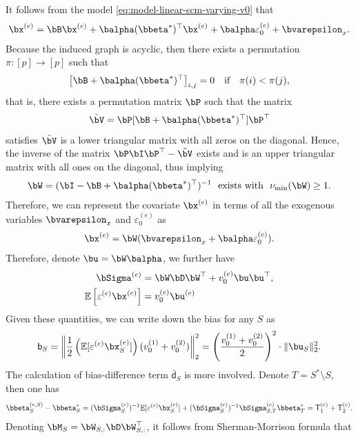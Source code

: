 \documentclass[10pt]{article}
\numberwithin{equation}{section}
\begin{document}
It follows from the model \eqref{eq:model-linear-scm-varying-v0} that
\begin{align*}
\bx^{(e)} = \bB \bx^{(e)} + 	\balpha (\bbeta^*)^\top \bx^{(e)} + \balpha \varepsilon^{(e)}_0 + \bvarepsilon_x.
\end{align*} Because the induced graph is acyclic, then there exists a permutation $\pi: [p] \to [p]$ such that
\begin{align*}
	\left[\bB + \balpha (\bbeta^*)^\top \right]_{i,j} = 0 ~~~ \text{if} ~~~ \pi(i) < \pi(j),
\end{align*} that is, there exists a permutation matrix $\bP$ such that the matrix 
\begin{align*}
	\tilde{\bV} = \bP [\bB + \balpha (\bbeta^*)^\top] \bP^\top
\end{align*} satisfies $\tilde{\bV}$ is a lower triangular matrix with all zeros on the diagonal. Hence, the inverse of the matrix $\bP \bI \bP^\top - \tilde{\bV}$ exists and is an upper triangular matrix with all ones on the diagonal, thus implying
\begin{align*}
	\bW = (\bI - \bB + \balpha (\bbeta^*)^\top)^{-1} ~~\text{exists with}~~ \nu_{\min}(\bW) \ge 1.
\end{align*} Therefore, we can represent the covariate $\bx^{(e)}$ in terms of all the exogenous variables $\bvarepsilon_x$ and $\varepsilon_0^{(e)}$ as
\begin{align}
\label{eq:proof-ex2-eq-x}
	\bx^{(e)} = \bW (\bvarepsilon_x + \balpha \varepsilon_0^{(e)}).
\end{align} Therefore, denote $\bu = \bW \balpha$, we further have
\begin{align}
\bSigma^{(e)} &= \bW \bD \bW^\top + v_0^{(e)} \bu \bu^\top,\\
\mathbb{E}\left[\varepsilon^{(e)} \bx^{(e)}\right] &= v_0^{(e)} \bu^{(e)}
\end{align}
Given these quantities, we can write down the bias for any $S$ as
\begin{align}
\label{eq:proof-ex2-b}
	\mathsf{b}_S = \left\|\frac{1}{2} \left(\mathbb{E}[\varepsilon^{(e)} \bx_S^{(e)}]\right) (v_0^{(1)} + v_0^{(2)}) \right\|_2^2 = \Bigg(\frac{v_0^{(1)} + v_0^{(2)}}{2}\Bigg)^2 \cdot \|\bu_S\|_2^2.
\end{align}
The calculation of bias-difference term $\bar{\mathsf{d}}_S$ is more involved. Denote $T=S^*\setminus S$, then one has
\begin{align*}
	\bbeta^{(e,S)}_S - \bbeta^*_S = (\bSigma_S^{(e)})^{-1} \mathbb{E}[\varepsilon^{(e)} \bx_S^{(e)}] + (\bSigma_S^{(e)})^{-1} \bSigma_{S,T}^{(e)} \bbeta_T^* = \mathsf{T}_1^{(e)} + \mathsf{T}_2^{(e)}.
\end{align*} Denoting $\bM_S = \bW_{S,:} \bD \bW_{S,:}^\top$, it follows from Sherman-Morrison formula that
\end{document}
